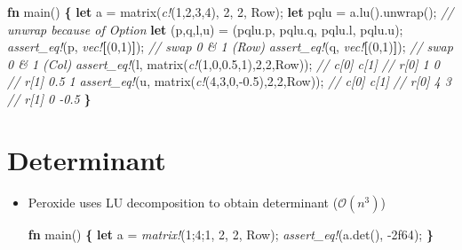 \documentclass[]{book}
\newenvironment{Shaded}{\begin{snugshade}}{\end{snugshade}}
\newcommand{\CommentTok}[1]{\textcolor[rgb]{0.56,0.35,0.01}{\textit{#1}}}
\newcommand{\DecValTok}[1]{\textcolor[rgb]{0.00,0.00,0.81}{#1}}
\newcommand{\KeywordTok}[1]{\textcolor[rgb]{0.13,0.29,0.53}{\textbf{#1}}}
\newcommand{\NormalTok}[1]{#1}
\newcommand{\OperatorTok}[1]{\textcolor[rgb]{0.81,0.36,0.00}{\textbf{#1}}}
\newcommand{\PreprocessorTok}[1]{\textcolor[rgb]{0.56,0.35,0.01}{\textit{#1}}}
\begin{document}
\begin{itemize}
\begin{Shaded}
\begin{Highlighting}[]
\KeywordTok{fn}\NormalTok{ main() }\OperatorTok{\{}
    \KeywordTok{let}\NormalTok{ a = matrix(}\PreprocessorTok{c!}\NormalTok{(}\DecValTok{1}\NormalTok{,}\DecValTok{2}\NormalTok{,}\DecValTok{3}\NormalTok{,}\DecValTok{4}\NormalTok{), }\DecValTok{2}\NormalTok{, }\DecValTok{2}\NormalTok{, Row);}
    \KeywordTok{let}\NormalTok{ pqlu = a.lu().unwrap(); }\CommentTok{// unwrap because of Option}
    \KeywordTok{let}\NormalTok{ (p,q,l,u) = (pqlu.p, pqlu.q, pqlu.l, pqlu.u);}
    \PreprocessorTok{assert_eq!}\NormalTok{(p, }\PreprocessorTok{vec!}\OperatorTok{[}\NormalTok{(}\DecValTok{0}\NormalTok{,}\DecValTok{1}\NormalTok{)}\OperatorTok{]}\NormalTok{); }\CommentTok{// swap 0 & 1 (Row)}
    \PreprocessorTok{assert_eq!}\NormalTok{(q, }\PreprocessorTok{vec!}\OperatorTok{[}\NormalTok{(}\DecValTok{0}\NormalTok{,}\DecValTok{1}\NormalTok{)}\OperatorTok{]}\NormalTok{); }\CommentTok{// swap 0 & 1 (Col)}
    \PreprocessorTok{assert_eq!}\NormalTok{(l, matrix(}\PreprocessorTok{c!}\NormalTok{(}\DecValTok{1}\NormalTok{,}\DecValTok{0}\NormalTok{,}\DecValTok{0.5}\NormalTok{,}\DecValTok{1}\NormalTok{),}\DecValTok{2}\NormalTok{,}\DecValTok{2}\NormalTok{,Row));}
    \CommentTok{//      c[0] c[1]}
    \CommentTok{// r[0]    1    0}
    \CommentTok{// r[1]  0.5    1}
    \PreprocessorTok{assert_eq!}\NormalTok{(u, matrix(}\PreprocessorTok{c!}\NormalTok{(}\DecValTok{4}\NormalTok{,}\DecValTok{3}\NormalTok{,}\DecValTok{0}\NormalTok{,-}\DecValTok{0.5}\NormalTok{),}\DecValTok{2}\NormalTok{,}\DecValTok{2}\NormalTok{,Row));}
    \CommentTok{//      c[0] c[1]}
    \CommentTok{// r[0]    4    3}
    \CommentTok{// r[1]    0 -0.5}
\OperatorTok{\}}
\end{Highlighting}
\end{Shaded}
\end{itemize}

\hypertarget{determinant}{%
\section{Determinant}\label{determinant}}

\begin{itemize}
\item
  Peroxide uses LU decomposition to obtain determinant (\(\mathcal{O}(n^3)\))

\begin{Shaded}
\begin{Highlighting}[]
\KeywordTok{fn}\NormalTok{ main() }\OperatorTok{\{}
    \KeywordTok{let}\NormalTok{ a = }\PreprocessorTok{matrix!}\NormalTok{(}\DecValTok{1}\NormalTok{;}\DecValTok{4}\NormalTok{;}\DecValTok{1}\NormalTok{, }\DecValTok{2}\NormalTok{, }\DecValTok{2}\NormalTok{, Row);}
    \PreprocessorTok{assert_eq!}\NormalTok{(a.det(), -}\DecValTok{2f64}\NormalTok{);}
\OperatorTok{\}}
\end{Highlighting}
\end{Shaded}
\end{itemize}
\end{document}

